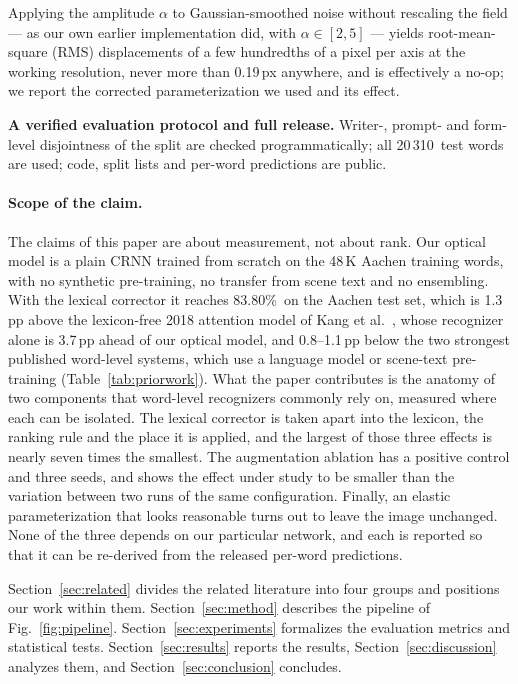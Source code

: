 \documentclass{ws-ijprai}
\newcommand{\ourwa}{83.80\%}
\newcommand{\nsamples}{20\,310}
\begin{document}
\begin{itemlist}
        Applying the amplitude $\alpha$ to Gaussian-smoothed noise without
        rescaling the field --- as our own earlier implementation did, with
        $\alpha\in[2,5]$ --- yields root-mean-square (RMS)
        displacements of a few hundredths of a pixel per axis at the working
        resolution, never more than 0.19\,px anywhere, and is effectively a
        no-op; we report the corrected parameterization we used and its
        effect.
  \item \textbf{A verified evaluation protocol and full release.}
        Writer-, prompt- and form-level disjointness of the split are
        checked programmatically; all \nsamples\ test words are used;
        code, split lists and per-word predictions are public.
\end{itemlist}

\paragraph{Scope of the claim.}
The claims of this paper are about measurement, not about rank. Our optical
model is a plain CRNN trained from scratch on the 48\,K Aachen training
words, with no synthetic pre-training, no transfer from scene text and no
ensembling. With the lexical corrector it reaches \ourwa\ on the Aachen
test set, which is 1.3\,pp above the lexicon-free 2018 attention model of
Kang et al.~\cite{kang2018convolve}, whose recognizer alone is 3.7\,pp ahead
of our optical model, and 0.8--1.1\,pp below the two strongest published word-level systems, which use
a language model or scene-text pre-training (Table~\ref{tab:priorwork}). What
the paper contributes is the anatomy of two components that word-level
recognizers commonly rely on, measured where each can be isolated. The lexical corrector is taken
apart into the lexicon, the ranking rule and the place it is applied, and
the largest of those three effects is nearly seven times the smallest. The
augmentation
ablation has a positive control and three seeds, and shows the effect under
study to be smaller than the variation between two runs of the same
configuration. Finally, an elastic parameterization that looks reasonable
turns out to leave the image unchanged. None of the three depends on our particular network, and each is reported so that it can be re-derived from the released
per-word predictions.

Section~\ref{sec:related} divides the related literature into four groups
and positions our work within them.
Section~\ref{sec:method} describes the pipeline of
Fig.~\ref{fig:pipeline}. Section~\ref{sec:experiments} formalizes the
evaluation metrics and statistical tests.
Section~\ref{sec:results} reports the results,
Section~\ref{sec:discussion} analyzes them, and
Section~\ref{sec:conclusion} concludes.
\end{document}

